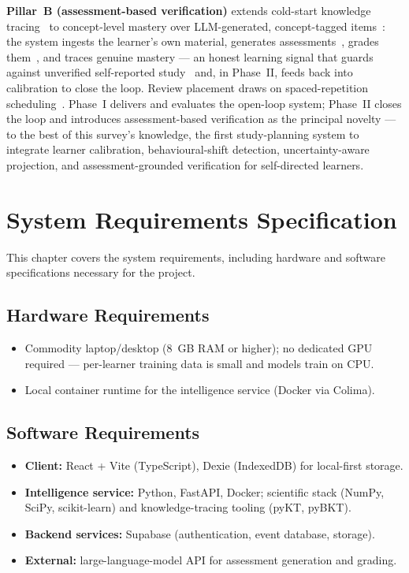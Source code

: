 \documentclass[12pt]{report}
\begin{document}
\textbf{Pillar~B (assessment-based verification)} extends cold-start knowledge
tracing~\cite{clst2024,maml2026} to concept-level mastery over LLM-generated,
concept-tagged items~\cite{conceptkt2026,lecturequiz2026,kctag2024,concepttag2024}: the
system ingests the learner's own material, generates assessments~\cite{itemgen2024},
grades them~\cite{llmgrade2024}, and traces genuine mastery --- an honest learning signal
that guards against unverified self-reported study~\cite{gaming2026} and, in Phase~II,
feeds back into calibration to close the loop. Review placement draws on spaced-repetition
scheduling~\cite{spaced2025}. Phase~I delivers and evaluates the open-loop system; Phase~II
closes the loop and introduces assessment-based verification as the principal novelty ---
to the best of this survey's knowledge, the first study-planning system to integrate
learner calibration, behavioural-shift detection, uncertainty-aware projection, and
assessment-grounded verification for self-directed learners.

\newpage

\chapter{System Requirements Specification}

This chapter covers the system requirements, including hardware and software
specifications necessary for the project.

\section{Hardware Requirements}
\begin{itemize}[noitemsep]
    \item Commodity laptop/desktop (8~GB RAM or higher); no dedicated GPU required ---
    per-learner training data is small and models train on CPU.
    \item Local container runtime for the intelligence service (Docker via Colima).
\end{itemize}

\section{Software Requirements}
\begin{itemize}[noitemsep]
    \item \textbf{Client:} React + Vite (TypeScript), Dexie (IndexedDB) for local-first storage.
    \item \textbf{Intelligence service:} Python, FastAPI, Docker; scientific stack
    (NumPy, SciPy, scikit-learn) and knowledge-tracing tooling (pyKT, pyBKT).
    \item \textbf{Backend services:} Supabase (authentication, event database, storage).
    \item \textbf{External:} large-language-model API for assessment generation and grading.
\end{itemize}
\end{document}
